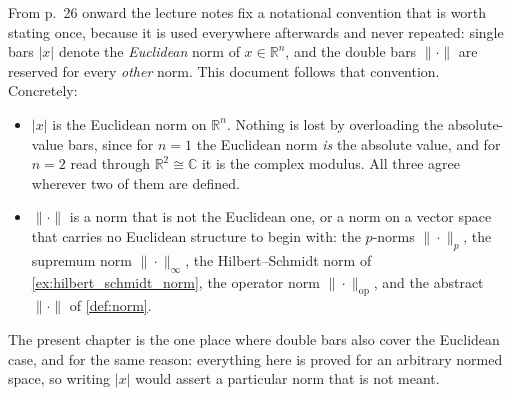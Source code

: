 \begin{ainote}
\label{ainote:norm_convention}
From p.\ 26 onward the lecture notes fix a notational convention that is worth stating once,
because it is used everywhere afterwards and never repeated: single bars $|x|$ denote the
\emph{Euclidean} norm of $x \in \mathbb{R}^n$, and the double bars $\|\cdot\|$ are reserved for
every \emph{other} norm. This document follows that convention. Concretely:
\begin{itemize}
  \item $|x|$ is the Euclidean norm on $\mathbb{R}^n$. Nothing is lost by overloading the
    absolute-value bars, since for $n=1$ the Euclidean norm \emph{is} the absolute value, and
    for $n = 2$ read through $\mathbb{R}^2 \cong \mathbb{C}$ it is the complex modulus. All
    three agree wherever two of them are defined.
  \item $\|\cdot\|$ is a norm that is not the Euclidean one, or a norm on a vector space that
    carries no Euclidean structure to begin with: the $p$-norms $\|\cdot\|_p$, the supremum
    norm $\|\cdot\|_\infty$, the Hilbert--Schmidt norm of \cref{ex:hilbert_schmidt_norm}, the
    operator norm $\|\cdot\|_{\mathrm{op}}$, and the abstract $\|\cdot\|$ of
    \cref{def:norm}.
\end{itemize}
The present chapter is the one place where double bars also cover the Euclidean case, and for
the same reason: everything here is proved for an arbitrary normed space, so writing $|x|$ would
assert a particular norm that is not meant.
\end{ainote}


